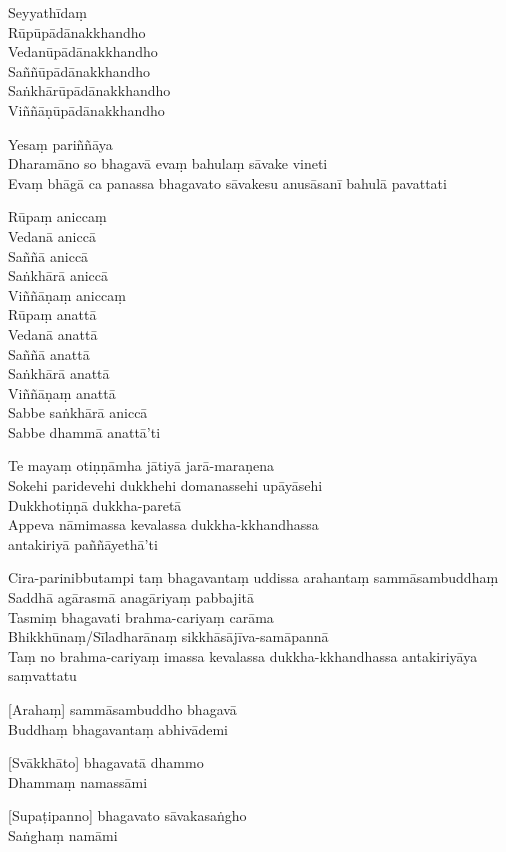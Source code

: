 Seyyathīdaṃ\\
Rūpūpādānakkhandho\\
Vedanūpādānakkhandho\\
Saññūpādānakkhandho\\
Saṅkhārūpādānakkhandho\\
Viññāṇūpādānakkhandho

Yesaṃ pariññāya\\
Dharamāno so bhagavā evaṃ bahulaṃ sāvake vineti\\
Evaṃ bhāgā ca panassa bhagavato sāvakesu anusāsanī bahulā pavattati

Rūpaṃ aniccaṃ\\
Vedanā aniccā\\
Saññā aniccā\\
Saṅkhārā aniccā\\
Viññāṇaṃ aniccaṃ\\
Rūpaṃ anattā\\
Vedanā anattā\\
Saññā anattā\\
Saṅkhārā anattā\\
Viññāṇaṃ anattā\\
Sabbe saṅkhārā aniccā\\
Sabbe dhammā anattā'ti

Te mayaṃ otiṇṇāmha jātiyā jarā-maraṇena\\
Sokehi paridevehi dukkhehi domanassehi upāyāsehi\\
Dukkhotiṇṇā dukkha-paretā\\
Appeva nāmimassa kevalassa dukkha-kkhandhassa\\
antakiriyā paññāyethā'ti

Cira-parinibbutampi taṃ bhagavantaṃ uddissa arahantaṃ sammāsambuddhaṃ\\
Saddhā agārasmā anagāriyaṃ pabbajitā\\
Tasmiṃ bhagavati brahma-cariyaṃ carāma\\
Bhikkhūnaṃ/Sīladharānaṃ sikkhāsājīva-samāpannā\\
Taṃ no brahma-cariyaṃ imassa kevalassa dukkha-kkhandhassa antakiriyāya saṃvattatu

[Arahaṃ] sammāsambuddho bhagavā\\
Buddhaṃ bhagavantaṃ abhivādemi

[Svākkhāto] bhagavatā dhammo\\
Dhammaṃ namassāmi

[Supaṭipanno] bhagavato sāvakasaṅgho\\
Saṅghaṃ namāmi

